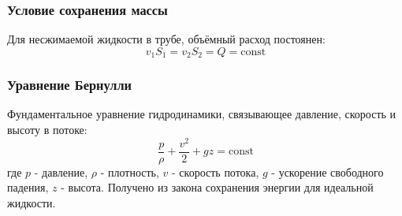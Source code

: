 \documentclass[12pt]{article}
\begin{document}
\subsubsection*{Условие сохранения массы}
Для несжимаемой жидкости в трубе, объёмный расход постоянен:
\[
v_1 S_1 = v_2 S_2 = Q = \text{const}
\]

\subsubsection*{Уравнение Бернулли}
Фундаментальное уравнение гидродинамики, связывающее давление, скорость и высоту в потоке:
\[
\frac{p}{\rho} + \frac{v^2}{2} + gz = \text{const}
\]
где $p$ - давление, $\rho$ - плотность, $v$ - скорость потока, $g$ - ускорение свободного падения, $z$ - высота. Получено из закона сохранения энергии для идеальной жидкости.
\end{document}
